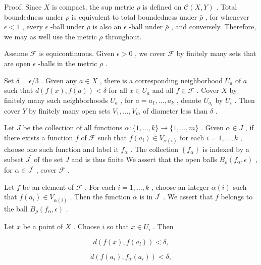 Proof. Since \(X\) is compact, the sup metric \(\rho\) is defined on \(\mathcal{C}\left( {X,Y}\right)\) . Total boundedness under \(\rho\) is equivalent to total boundedness under \(\bar{\rho }\) , for whenever \(\epsilon  < 1\) , every \(\epsilon\) -ball under \(\rho\) is also an \(\epsilon\) -ball under \(\bar{\rho }\) , and conversely. Therefore, we may as well use the metric \(\rho\) throughout.

Assume \(\mathcal{F}\) is equicontinuous. Given \(\epsilon  > 0\) , we cover \(\mathcal{F}\) by finitely many sets that are open \(\epsilon\) -balls in the metric \(\rho\) .

Set \(\delta  = \epsilon /3\) . Given any \(a \in  X\) , there is a corresponding neighborhood \({U}_{a}\) of \(a\) such that \(d\left( {f\left( x\right) ,f\left( a\right) }\right)  < \delta\) for all \(x \in  {U}_{a}\) and all \(f \in  \mathcal{F}\) . Cover \(X\) by finitely many such neighborhoods \({U}_{a}\) , for \(a = {a}_{1},\ldots ,{a}_{k}\) , denote \({U}_{{a}_{i}}\) by \({U}_{i}\) . Then cover \(Y\) by finitely many open sets \({V}_{1},\ldots ,{V}_{m}\) of diameter less than \(\delta\) .

Let \(J\) be the collection of all functions \(\alpha  : \{ 1,\ldots ,k\}  \rightarrow  \{ 1,\ldots ,m\}\) . Given \(\alpha  \in  J\) , if there exists a function \(f\) of \(\mathcal{F}\) such that \(f\left( {a}_{i}\right)  \in  {V}_{\alpha \left( i\right) }\) for each \(i = 1,\ldots ,k\) , choose one such function and label it \({f}_{\alpha }\) . The collection \(\left\{  {f}_{\alpha }\right\}\) is indexed by a subset \({J}^{\prime }\) of the set \(J\) and is thus finite We assert that the open balls \({B}_{\rho }\left( {{f}_{\alpha },\epsilon }\right)\) , for \(\alpha  \in  {J}^{\prime }\) , cover \(\mathcal{F}\) .

Let \(f\) be an element of \(\mathcal{F}\) . For each \(i = 1,\ldots ,k\) , choose an integer \(\alpha \left( i\right)\) such that \(f\left( {a}_{i}\right)  \in  {V}_{\alpha \left( i\right) }\) . Then the function \(\alpha\) is in \({J}^{\prime }\) . We assert that \(f\) belongs to the ball \({B}_{\rho }\left( {{f}_{\alpha },\epsilon }\right)\) .

Let \(x\) be a point of \(X\) . Choose \(i\) so that \(x \in  {U}_{i}\) . Then

\[
d\left( {f\left( x\right) ,f\left( {a}_{l}\right) }\right)  < \delta ,
\]

\[
d\left( {f\left( {a}_{i}\right) ,{f}_{\alpha }\left( {a}_{i}\right) }\right)  < \delta ,
\]

